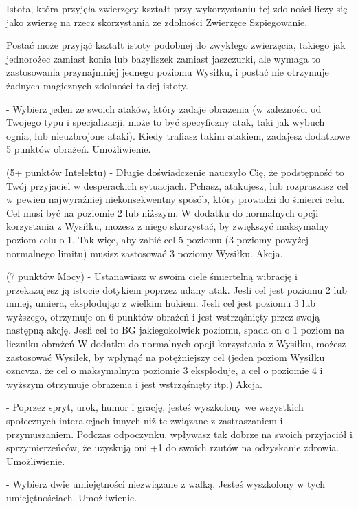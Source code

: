 {Istota, która przyjęła zwierzęcy kształt przy wykorzystaniu tej zdolności liczy się jako zwierzę na rzecz skorzystania ze zdolności Zwierzęce Szpiegowanie.

Postać może przyjąć kształt istoty podobnej do zwykłego zwierzęcia, takiego jak jednorożec zamiast konia lub bazyliszek zamiast jaszczurki, ale wymaga to zastosowania przynajmniej jednego poziomu Wysiłku, i postać nie otrzymuje żadnych magicznych zdolności takiej istoty.

 - Wybierz jeden ze swoich ataków, który zadaje obrażenia (w zależności od Twojego typu i specjalizacji, może to być specyficzny atak, taki jak wybuch ognia, lub nieuzbrojone ataki). Kiedy trafiasz takim atakiem, zadajesz dodatkowe 5 punktów obrażeń. Umożliwienie.

 (5+ punktów Intelektu) - Długie doświadczenie nauczyło Cię, że podstępność to Twój przyjaciel w desperackich sytuacjach. Pchasz, atakujesz, lub rozpraszasz cel w pewien najwyraźniej niekonsekwentny sposób, który prowadzi do śmierci celu. Cel musi być na poziomie 2 lub niższym. W dodatku do normalnych opcji korzystania z Wysiłku, możesz z niego skorzystać, by zwiększyć maksymalny poziom celu o 1. Tak więc, aby zabić cel 5 poziomu (3 poziomy powyżej normalnego limitu) musisz zastosować 3 poziomy Wysiłku. Akcja.

 (7 punktów Mocy) - Ustanawiasz w swoim ciele śmiertelną wibrację i przekazujesz ją istocie dotykiem poprzez udany atak. Jesli cel jest poziomu 2 lub mniej, umiera, eksplodując z wielkim hukiem. Jesli cel jest poziomu 3 lub wyższego, otrzymuje on 6 punktów obrażeń i jest wstrząśnięty przez swoją następną akcję. Jesli cel to BG jakiegokolwiek poziomu, spada on o 1 poziom na liczniku obrażeń W dodatku do normalnych opcji korzystania z Wysiłku, możesz zastosować Wysiłek, by wpłynąć na potężniejszy cel (jeden poziom Wysiłku ozncvza, że cel o maksymalnym poziomie 3 eksploduje, a cel o poziomie 4 i wyższym otrzymuje obrażenia i jest wstrząśnięty itp.) Akcja.

 - Poprzez spryt, urok, humor i grację, jesteś wyszkolony we wszystkich społecznych interakcjach innych niż te związane z zastraszaniem i przymuszaniem. Podczas odpoczynku, wpływasz tak dobrze na swoich przyjaciół i sprzymierzeńców, że uzyskują oni +1 do swoich rzutów na odzyskanie zdrowia. Umożliwienie.

 - Wybierz dwie umiejętności niezwiązane z walką. Jesteś wyszkolony w tych umiejętnościach. Umożliwienie.

}
